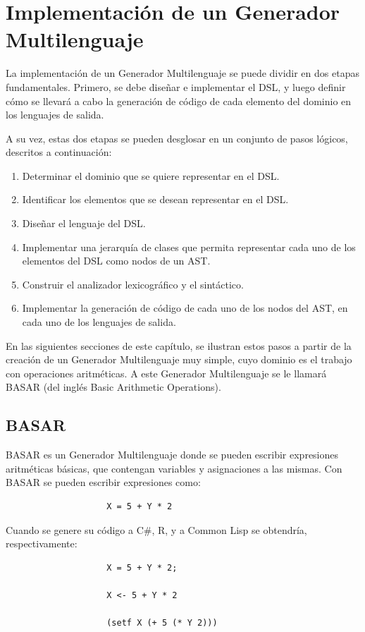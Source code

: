 \chapter{Implementación de un Generador Multilenguaje}
\label{chap:implementacion de un generador }
La implementación de un Generador Multilenguaje se puede dividir en dos etapas fundamentales. Primero, se debe diseñar e implementar el DSL, y luego definir cómo se llevará a cabo la generación de código de cada elemento del dominio en los lenguajes de salida.

A su vez, estas dos etapas se pueden desglosar en un conjunto de pasos lógicos, descritos a continuación:
\begin{enumerate}
	\item Determinar el dominio que se quiere representar en el DSL.
	\item Identificar los elementos que se desean representar en el DSL.
	\item \label{item:diseñar-dsl} Dise\~nar el lenguaje del DSL.
	\item \label{item:jerarquia-de-clases}Implementar una jerarqu\'ia de clases que permita representar cada uno de los elementos del DSL como nodos de un AST.
	\item \label{item:paso-parser-lexer} Construir el analizador lexicogr\'afico y el sint\'actico.
	\item 	\label{item:generacion-de-codigo}Implementar la generaci\'on de c\'odigo de cada uno de los nodos del AST, en cada uno de los lenguajes de salida.
\end{enumerate}

En las siguientes secciones de este capítulo, se ilustran estos pasos a partir de la creación de un Generador Multilenguaje muy simple, cuyo dominio es el trabajo con operaciones aritméticas. A este Generador Multilenguaje se le llamará BASAR (del inglés Basic Arithmetic Operations).

\section{BASAR}

BASAR es un Generador Multilenguaje donde se pueden escribir expresiones aritméticas básicas, que contengan variables y asignaciones a las mismas. Con BASAR se pueden escribir expresiones como:

\begin{verbatim}
                    X = 5 + Y * 2 
\end{verbatim}
Cuando se genere su código a C\#, R, y a Common Lisp se obtendría, respectivamente:
\begin{verbatim}
                    X = 5 + Y * 2;
                    
                    X <- 5 + Y * 2
                    
                    (setf X (+ 5 (* Y 2)))
\end{verbatim}

